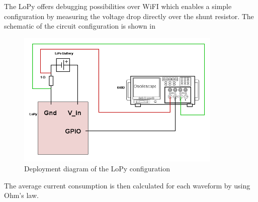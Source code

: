 The LoPy offers debugging possibilities over WiFI which enables a simple configuration by measuring the voltage drop directly over the shunt resistor. The schematic of the circuit configuration is shown in 

\begin{figure}[H]
\centering
\includegraphics[height=6.5cm]{Project_Report/Images/LoPy_Schematic.png}
\caption{Deployment diagram of the LoPy configuration}
\label{fig:LoPy_Schematic}
\end{figure}




The average current consumption is then calculated for each waveform by using Ohm's law.
\newpage